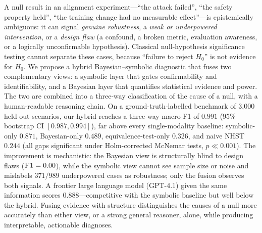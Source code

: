 A null result in an alignment experiment---``the attack failed'', ``the safety
property held'', ``the training change had no measurable effect''---is
epistemically ambiguous: it can signal \emph{genuine robustness}, a
\emph{weak or underpowered intervention}, or a \emph{design flaw} (a confound,
a broken metric, evaluation awareness, or a logically unconfirmable hypothesis).
Classical null-hypothesis significance testing cannot separate these cases,
because ``failure to reject $H_0$'' is not evidence for $H_0$. We propose a
hybrid Bayesian--symbolic diagnostic that fuses two complementary views: a
symbolic layer that gates confirmability and identifiability, and a Bayesian
layer that quantifies statistical evidence and power. The two are combined into
a three-way classification of the cause of a null, with a human-readable
reasoning chain. On a ground-truth-labelled benchmark of 3{,}000 held-out
scenarios, our hybrid reaches a three-way macro-F1 of $0.991$ (95\% bootstrap CI
$[0.987, 0.994]$), far above every single-modality baseline: symbolic-only
$0.871$, Bayesian-only $0.489$, equivalence-test-only $0.326$, and naive NHST
$0.244$ (all gaps significant under Holm-corrected McNemar tests,
$p \ll 0.001$). The improvement is mechanistic: the Bayesian view is structurally
blind to design flaws ($\textsc{F1}=0.00$), while the symbolic view cannot see
sample size or noise and mislabels $371/989$ underpowered cases as robustness;
only the fusion observes both signals. A frontier large language model
(GPT-4.1) given the same information scores $0.888$---competitive with the
symbolic baseline but well below the hybrid. Fusing evidence with structure
distinguishes the causes of a null more accurately than either view, or a strong
general reasoner, alone, while producing interpretable, actionable diagnoses.
